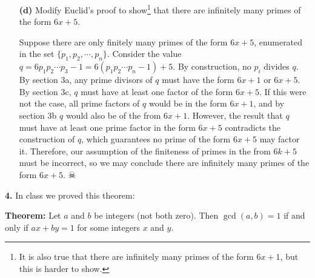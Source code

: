 \documentclass[12pt]{amsart}
\begin{document}
\begin{itemize}
\medskip

\item[{\bf (d)}] Modify Euclid's proof to show\footnote{It is also true that there are infinitely many primes of the form $6x+1$, but this is harder to show.} that there are infinitely many primes of the form $6x+5$. 

\medskip

Suppose there are only finitely many primes of the form $6x + 5$, enumerated in the set $\{p_1, p_2,\cdots,p_n\}$. Consider the value $q = 6p_1 p_2 \cdots p_3 - 1 = 6(p_1p_2\cdots p_n - 1) + 5$. By construction, no $p_i$ divides $q$. By section 3a, any prime divisors of $q$ must have the form $6x + 1$ or $6x + 5$. By section 3c, $q$ must have at least one factor of the form $6x + 5$. If this were not the case, all prime factors of $q$ would be in the form $6x + 1$, and by section 3b $q$ would also be of the from $6x + 1$. However, the result that $q$ must have at least one prime factor in the form $6x + 5$ contradicts the construction of $q$, which guarantees no prime of the form $6x + 5$ may factor it. Therefore, our assumption of the finiteness of primes in the from $6k + 5$ must be incorrect, so we may conclude there are infinitely many primes of the form $6x + 5$. $\skull$

\medskip


\end{itemize}

{\bf 4.} In class we proved this theorem: 

\medskip

{\bf Theorem:} Let $a$ and $b$ be integers (not both zero).  Then $\gcd(a,b)=1$ if and only if $ax+by=1$ for some integers $x$ and $y$.  

\medskip
\end{document}
